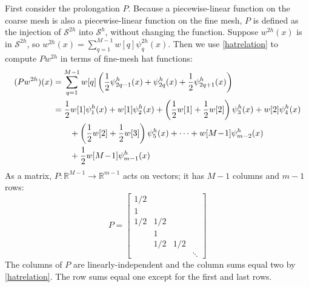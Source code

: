 \documentclass[letterpaper,final,12pt,reqno]{amsart}
\newcommand{\RR}{\mathbb{R}}
\begin{document}
First consider the prolongation $P$.  Because a piecewise-linear function on the coarse mesh is also a piecewise-linear function on the fine mesh, $P$ is defined as the injection of $\mathcal{S}^{2h}$ into $\mathcal{S}^h$, without changing the function.  Suppose $w^{2h}(x)$ is in $\mathcal{S}^{2h}$, so $w^{2h}(x) = \sum_{q=1}^{M-1} w[q] \psi_q^{2h}(x)$.  Then we use \eqref{hatrelation} to compute $P w^{2h}$ in terms of fine-mesh hat functions:
\begin{align}
(P w^{2h})(x) &= \sum_{q=1}^{M-1} w[q] \left(\frac{1}{2} \psi_{2q-1}^h(x) + \psi_{2q}^h(x) + \frac{1}{2} \psi_{2q+1}^h(x)\right) \label{pformula} \\
              &= \frac{1}{2} w[1] \psi_1^h(x) + w[1] \psi_2^h(x) + \left(\frac{1}{2} w[1] + \frac{1}{2} w[2]\right) \psi_3^h(x) + w[2] \psi_4^h(x) \notag \\
              &\qquad + \left(\frac{1}{2} w[2] + \frac{1}{2} w[3]\right) \psi_5^h(x) + \dots + w[M\!-\!1] \psi_{m-2}^h(x) \notag \\
              &\qquad + \frac{1}{2} w[M\!-\!1] \psi_{m-1}^h(x) \notag
\end{align}
As a matrix, $P:\RR^{M-1} \to \RR^{m-1}$ acts on vectors; it has $M-1$ columns and $m-1$ rows:
\begin{equation}
P = \begin{bmatrix}
1/2 & & & \\
1 & & & \\
1/2 & 1/2 & & \\
 & 1 & & \\
 & 1/2 & 1/2 & \\
 & & & \ddots
\end{bmatrix} \label{pmatrix}
\end{equation}
The columns of $P$ are linearly-independent and the column sums equal two by \eqref{hatrelation}.  The row sums equal one except for the first and last rows.
\end{document}
